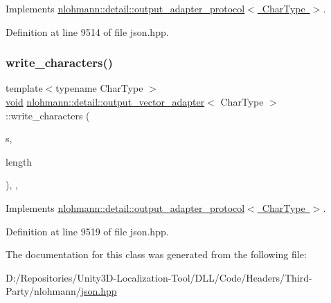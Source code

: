 Implements \mbox{\hyperlink{structnlohmann_1_1detail_1_1output__adapter__protocol_a3381896fe1be557f591de2e917cdc7d5}{nlohmann\+::detail\+::output\+\_\+adapter\+\_\+protocol$<$ Char\+Type $>$}}.



Definition at line 9514 of file json.\+hpp.

\mbox{\label{classnlohmann_1_1detail_1_1output__vector__adapter_ad6f6c461dec7bedd5359454dc22fc9aa}} 
\subsubsection{\texorpdfstring{write\_characters()}{write\_characters()}}
{\footnotesize\ttfamily template$<$typename Char\+Type $>$ \\
\mbox{\hyperlink{namespacenlohmann_1_1detail_a59fca69799f6b9e366710cb9043aa77d}{void}} \mbox{\hyperlink{classnlohmann_1_1detail_1_1output__vector__adapter}{nlohmann\+::detail\+::output\+\_\+vector\+\_\+adapter}}$<$ Char\+Type $>$\+::write\+\_\+characters (\begin{DoxyParamCaption}\item[{const Char\+Type $\ast$}]{s,  }\item[{std\+::size\+\_\+t}]{length }\end{DoxyParamCaption})\hspace{0.3cm}{\ttfamily [inline]}, {\ttfamily [override]}, {\ttfamily [virtual]}}



Implements \mbox{\hyperlink{structnlohmann_1_1detail_1_1output__adapter__protocol_a2f410a164e0eda17cf6561114b0eee4a}{nlohmann\+::detail\+::output\+\_\+adapter\+\_\+protocol$<$ Char\+Type $>$}}.



Definition at line 9519 of file json.\+hpp.



The documentation for this class was generated from the following file\+:\begin{DoxyCompactItemize}
\item 
D\+:/\+Repositories/\+Unity3\+D-\/\+Localization-\/\+Tool/\+D\+L\+L/\+Code/\+Headers/\+Third-\/\+Party/nlohmann/\mbox{\hyperlink{json_8hpp}{json.\+hpp}}\end{DoxyCompactItemize}
